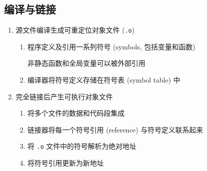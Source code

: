         \subsection{编译与链接}
        \begin{enumerate}
            \item 源文件编译生成可重定位对象文件 (\texttt{.o})
                \begin{enumerate}
                    \item 程序定义及引用一系列符号 (symbols, 包括变量和函数)

                        非静态函数和全局变量可以被外部引用
                    \item 编译器将符号定义存储在符号表 (symbol table) 中
                \end{enumerate}
            \item 完全链接后产生可执行对象文件
                \begin{enumerate}
                    \item 将多个文件的数据和代码段集成
                    \item 链接器将每一个符号引用 (reference) 与符号定义联系起来
                    \item 将 \texttt{.o} 文件中的符号解析为绝对地址
                    \item 将符号引用更新为新地址
                \end{enumerate}
        \end{enumerate}

